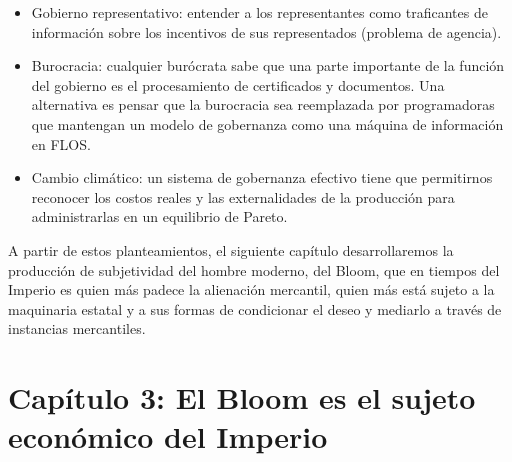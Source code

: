 \documentclass[
]{article}
\providecommand{\tightlist}{%
  \setlength{\itemsep}{0pt}\setlength{\parskip}{0pt}}
\begin{document}
\begin{itemize}
\tightlist
\item
  Gobierno representativo: entender a los representantes como
  traficantes de información sobre los incentivos de sus representados
  (problema de agencia).
\item
  Burocracia: cualquier burócrata sabe que una parte importante de la
  función del gobierno es el procesamiento de certificados y documentos.
  Una alternativa es pensar que la burocracia sea reemplazada por
  programadoras que mantengan un modelo de gobernanza como una máquina
  de información en FLOS.
\item
  Cambio climático: un sistema de gobernanza efectivo tiene que
  permitirnos reconocer los costos reales y las externalidades de la
  producción para administrarlas en un equilibrio de Pareto.
\end{itemize}

A partir de estos planteamientos, el siguiente capítulo desarrollaremos
la producción de subjetividad del hombre moderno, del Bloom, que en
tiempos del Imperio es quien más padece la alienación mercantil, quien
más está sujeto a la maquinaria estatal y a sus formas de condicionar el
deseo y mediarlo a través de instancias mercantiles.

\hypertarget{capuxedtulo-3-el-bloom-es-el-sujeto-econuxf3mico-del-imperio}{%
\section{Capítulo 3: El Bloom es el sujeto económico del
Imperio}\label{capuxedtulo-3-el-bloom-es-el-sujeto-econuxf3mico-del-imperio}}
\end{document}
